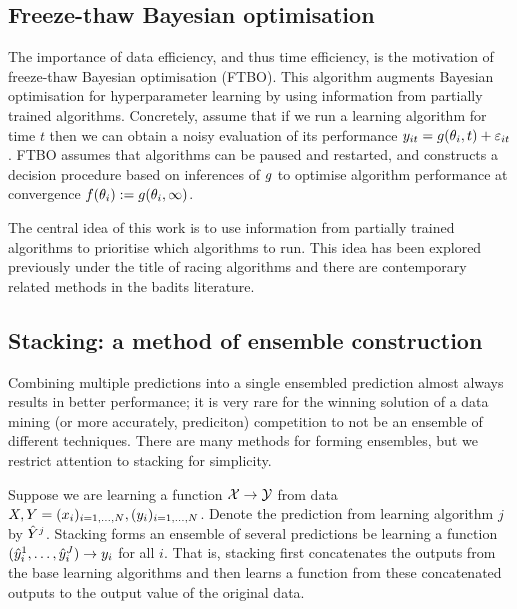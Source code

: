 \documentclass{article} %
\begin{document}

\subsection{Freeze-thaw Bayesian optimisation}

The importance of data efficiency, and thus time efficiency, is the motivation of freeze-thaw Bayesian optimisation (FTBO).
This algorithm augments Bayesian optimisation for hyperparameter learning by using information from partially trained algorithms.
Concretely, assume that if we run a learning algorithm for time $t$ then we can obtain a noisy evaluation of its performance $y_{it} = g(\theta_i, t) + \varepsilon_{it}$.
FTBO assumes that algorithms can be paused and restarted, and constructs a decision procedure based on inferences of $g$ to optimise algorithm performance at convergence \ie $f(\theta_i) := g(\theta_i, \infty)$.

The central idea of this work is to use information from partially trained algorithms to prioritise which algorithms to run.
This idea has been explored previously under the title of racing algorithms and there are contemporary related methods in the badits literature.

\subsection{Stacking: a method of ensemble construction}

Combining multiple predictions into a single ensembled prediction almost always results in better performance; it is very rare for the winning solution of a data mining (or more accurately, prediciton) competition to not be an ensemble of different techniques.
There are many methods for forming ensembles, but we restrict attention to stacking for simplicity.

Suppose we are learning a function $\mathcal{X} \to \mathcal{Y}$ from data $X, Y = (x_i)_{i=1,\dots,N}, (y_i)_{i=1,\dots,N}$.
Denote the prediction\footnotemark{} from learning algorithm $j$ by $\hat{Y}^j$.
Stacking forms an ensemble of several predictions be learning a function $(\hat{y}_i^1,\dots,\hat{y}_i^J) \to y_i$ for all $i$.
That is, stacking first concatenates the outputs from the base learning algorithms and then learns a function from these concatenated outputs to the output value of the original data.
\end{document}
